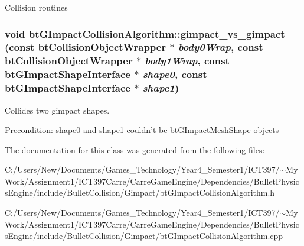 Collision routines \hypertarget{classbt_g_impact_collision_algorithm_2a6bd5ca4d26e3578d2613543e85429b}{
\subsubsection[gimpact\_\-vs\_\-gimpact]{\setlength{\rightskip}{0pt plus 5cm}void btGImpactCollisionAlgorithm::gimpact\_\-vs\_\-gimpact (const btCollisionObjectWrapper $\ast$ {\em body0Wrap}, \/  const btCollisionObjectWrapper $\ast$ {\em body1Wrap}, \/  const {\bf btGImpactShapeInterface} $\ast$ {\em shape0}, \/  const {\bf btGImpactShapeInterface} $\ast$ {\em shape1})}}
\label{classbt_g_impact_collision_algorithm_2a6bd5ca4d26e3578d2613543e85429b}


Collides two gimpact shapes. 

\begin{Desc}
\item[Precondition:]shape0 and shape1 couldn't be \hyperlink{classbt_g_impact_mesh_shape}{btGImpactMeshShape} objects \end{Desc}


The documentation for this class was generated from the following files:\begin{CompactItemize}
\item 
C:/Users/New/Documents/Games\_\-Technology/Year4\_\-Semester1/ICT397/$\sim$My Work/Assignment1/ICT397Carre/CarreGameEngine/Dependencies/BulletPhysicsEngine/include/BulletCollision/Gimpact/btGImpactCollisionAlgorithm.h\item 
C:/Users/New/Documents/Games\_\-Technology/Year4\_\-Semester1/ICT397/$\sim$My Work/Assignment1/ICT397Carre/CarreGameEngine/Dependencies/BulletPhysicsEngine/include/BulletCollision/Gimpact/btGImpactCollisionAlgorithm.cpp\end{CompactItemize}
